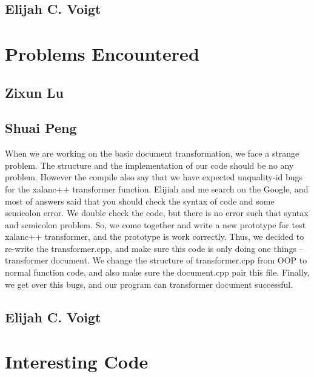 \subsection{Elijah C. Voigt}

\section{Problems Encountered}

\subsection{Zixun Lu}

\subsection{Shuai Peng}
When we are working on the basic document transformation, we face a strange problem.
The structure and the implementation of our code should be no any problem.
However the compile also say that we have expected unquality-id bugs for the xalanc++ transformer function.
Elijiah and me search on the Google, and most of answers said that you should check the syntax of code and some semicolon error.
We double check the code, but there is no error such that syntax and semicolon problem.
So, we come together and write a new prototype for test xalanc++ transformer, and the prototype is work correctly.
Thus, we decided to re-write the transformer.cpp, and make sure this code is only doing one things -- transformer document.
We change the structure of transformer.cpp from OOP to normal function code, and also make sure the document.cpp pair this file.
Finally, we get over this bugs, and our program can transformer document successful. 

\subsection{Elijah C. Voigt}

\section{Interesting Code}

